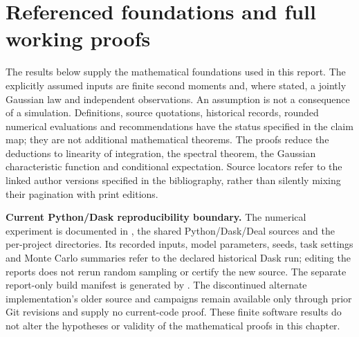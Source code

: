 \chapter{Referenced foundations and full working proofs}
\label{sec:proof-foundations}

The results below supply the mathematical foundations used in this report.
The explicitly assumed inputs are finite second moments and, where stated,
a jointly Gaussian law and independent observations. An assumption is not a
consequence of a simulation. Definitions, source quotations, historical
records, rounded numerical evaluations and recommendations have the status
specified in the claim map; they are not additional mathematical theorems.
The proofs reduce the deductions to linearity of integration, the spectral
theorem, the Gaussian characteristic function and conditional expectation.
Source locators refer to the linked author versions specified in the
bibliography, rather than silently mixing their pagination with print editions.

\noindent\textbf{Current Python/Dask reproducibility boundary.}
The numerical experiment is documented in
, the shared Python/Dask/Deal sources and
the per-project  directories. Its recorded
inputs, model parameters, seeds, task settings and Monte Carlo
summaries refer to the declared historical Dask run; editing the
reports does not rerun random sampling or certify the new source.
The separate report-only build manifest is generated by
. The discontinued alternate
implementation's older source and campaigns remain available only
through prior Git revisions and supply no current-code proof.
These finite software results do not alter the hypotheses or
validity of the mathematical proofs in this chapter.

